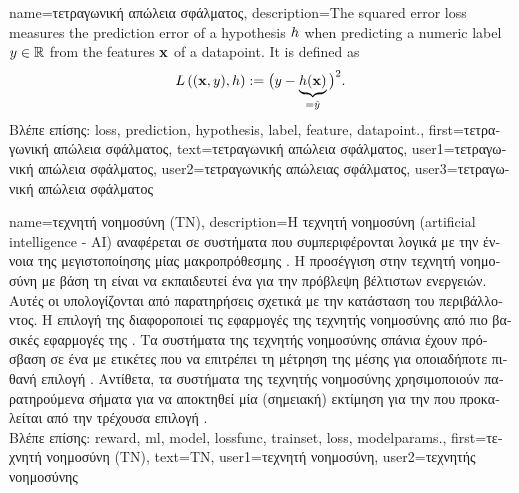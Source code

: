 {name={\foreignlanguage{greek}{τετραγωνική απώλεια σφάλματος}},
	description={The squared 
		error \gls{loss} measures the \gls{prediction} error of a 
		\gls{hypothesis} $h$ when predicting a numeric \gls{label} $y \in \mathbb{R}$ 
		from the \gls{feature}s ${\bf x}$ of a \gls{datapoint}. It is defined as 
		\begin{equation} 
			\nonumber
			L\left(({\bf x},y),h \right) := \big(y - \underbrace{h({\bf x})}_{=\hat{y}} \big)^{2}. 
		\end{equation} 
\foreignlanguage{greek}{Βλέπε επίσης:} \gls{loss}, \gls{prediction}, \gls{hypothesis}, \gls{label}, \gls{feature}, \gls{datapoint}.},
first={\foreignlanguage{greek}{τετραγωνική απώλεια σφάλματος}},
text={\foreignlanguage{greek}{τετραγωνική απώλεια σφάλματος}},
user1={\foreignlanguage{greek}{τετραγωνική απώλεια σφάλματος}}, %
user2={\foreignlanguage{greek}{τετραγωνικής απώλειας σφάλματος}}, %
user3={\foreignlanguage{greek}{τετραγωνική απώλεια σφάλματος}} %
}

{name={\foreignlanguage{greek}{τεχνητή νοημοσύνη (ΤΝ)}}, 
	description={\foreignlanguage{greek}{Η τεχνητή νοημοσύνη} (artificial intelligence - AI) 
		\foreignlanguage{greek}{αναφέρεται σε συστήματα που συμπεριφέρονται λογικά με την έννοια της  
		μεγιστοποίησης μίας μακροπρόθεσμης} . \foreignlanguage{greek}{Η προσέγγιση στην τεχνητή νοημοσύνη με βάση
		τη}  \foreignlanguage{greek}{είναι να εκπαιδευτεί ένα}  \foreignlanguage{greek}{για   
		την πρόβλεψη βέλτιστων ενεργειών. Αυτές οι}  \foreignlanguage{greek}{υπολογίζονται από 
		παρατηρήσεις σχετικά με την κατάσταση του περιβάλλοντος. Η επιλογή της} 
		 \foreignlanguage{greek}{διαφοροποιεί τις εφαρμογές της τεχνητής νοημοσύνης από πιο βασικές  
		εφαρμογές της} . \foreignlanguage{greek}{Τα συστήματα της τεχνητής νοημοσύνης σπάνια έχουν 
		πρόσβαση σε ένα}  \foreignlanguage{greek}{με ετικέτες που να επιτρέπει τη μέτρηση της 
		μέσης}  \foreignlanguage{greek}{για οποιαδήποτε πιθανή επιλογή} . 
		\foreignlanguage{greek}{Αντίθετα, τα συστήματα της τεχνητής νοημοσύνης χρησιμοποιούν παρατηρούμενα σήματα}  
		 \foreignlanguage{greek}{για να αποκτηθεί μία (σημειακή) εκτίμηση για την}  
		 \foreignlanguage{greek}{που προκαλείται από την τρέχουσα επιλογή} .\\
		\foreignlanguage{greek}{Βλέπε επίσης:} \gls{reward}, \gls{ml}, \gls{model}, \gls{lossfunc}, \gls{trainset}, \gls{loss}, \gls{modelparams}.},
		first={\foreignlanguage{greek}{τεχνητή νοημοσύνη (ΤΝ)}},
		text={\foreignlanguage{greek}{ΤΝ}},
		user1={\foreignlanguage{greek}{τεχνητή νοημοσύνη}}, %
		user2={\foreignlanguage{greek}{τεχνητής νοημοσύνης}} %
}

